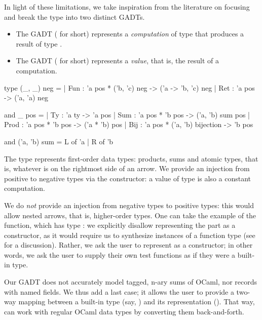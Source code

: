 In light of these limitations, we take inspiration from the literature on
focusing and break the  type into two distinct GADTs.
\begin{itemize}
  \item The GADT  ( for short) represents a
    \emph{computation} of type  that produces a result of type
    .
  \item The GADT  ( for short) represents a
    \emph{value}, that is, the result of a computation.
\end{itemize}
%
\begin{ocamlcode}
type (_, _) neg =
| Fun : 'a pos * ('b, 'c) neg -> ('a -> 'b, 'c) neg
| Ret : 'a pos -> ('a, 'a) neg

and _ pos =
| Ty : 'a ty -> 'a pos
| Sum : 'a pos * 'b pos -> ('a, 'b) sum pos
| Prod : 'a pos  * 'b pos -> ('a * 'b) pos
| Bij : 'a pos * ('a, 'b) bijection -> 'b pos

and ('a, 'b) sum = L of 'a | R of 'b
\end{ocamlcode}
%
The  type represents first-order data types: products, sums and atomic
types, that is, whatever is on the rightmost side of an arrow. We provide an
injection from positive to negative types via the  constructor: a
value of type  is also a constant computation.

We do \emph{not} provide an injection from negative types to positive types:
this would allow nested arrows, that is, higher-order types.  One can take the
example of the  function, which has type : we explicitly disallow
representing the  part as a
 constructor, as it would require us to synthesize instances of a
function type (see  for a discussion).
Rather, we ask the user to represent  as a  constructor;
in other words, we ask the user to supply their own test functions as if they
were a built-in type.

Our GADT does not accurately model tagged, n-ary sums of OCaml, nor records with
named fields. We thus add a last  case; it allows the user to
provide a two-way mapping between a built-in type (say, ) and
its \arti representation (). That way, \arti can work with regular
OCaml data types by converting them back-and-forth.

